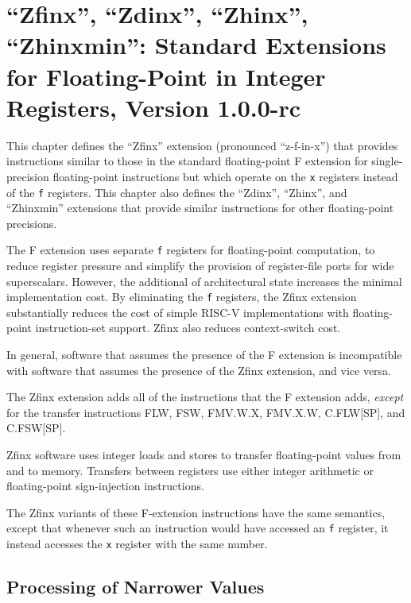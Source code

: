 \chapter{``Zfinx'', ``Zdinx'', ``Zhinx'', ``Zhinxmin'': Standard Extensions for Floating-Point in Integer Registers, Version 1.0.0-rc}
\label{sec:zfinx}

This chapter defines the ``Zfinx'' extension (pronounced ``z-f-in-x'')
that provides instructions similar to those in the standard
floating-point F extension for single-precision floating-point
instructions but which operate on the {\tt x} registers instead of the
{\tt f} registers.  This chapter also defines the ``Zdinx'',
``Zhinx'', and ``Zhinxmin'' extensions that provide similar
instructions for other floating-point precisions.

\begin{commentary}
The F extension uses separate {\tt f} registers for floating-point
computation, to reduce register pressure and simplify the provision of
register-file ports for wide superscalars.
However, the additional  of architectural state increases the
minimal implementation cost.
By eliminating the {\tt f} registers, the Zfinx extension substantially
reduces the cost of simple RISC-V implementations with floating-point
instruction-set support.
Zfinx also reduces context-switch cost.

In general, software that assumes the presence of the F extension
is incompatible with software that assumes the presence of the Zfinx
extension, and vice versa.
\end{commentary}

The Zfinx extension adds all of the instructions that the F extension
adds, {\em except} for the transfer instructions FLW, FSW, FMV.W.X,
FMV.X.W, C.FLW[SP], and C.FSW[SP].

\begin{commentary}
Zfinx software uses integer loads and stores to transfer floating-point values
from and to memory.
Transfers between registers use either integer arithmetic or floating-point
sign-injection instructions.
\end{commentary}

The Zfinx variants of these F-extension instructions have the same semantics,
except that whenever such an instruction would have accessed an {\tt f}
register, it instead accesses the {\tt x} register with the same number.

\section{Processing of Narrower Values}

